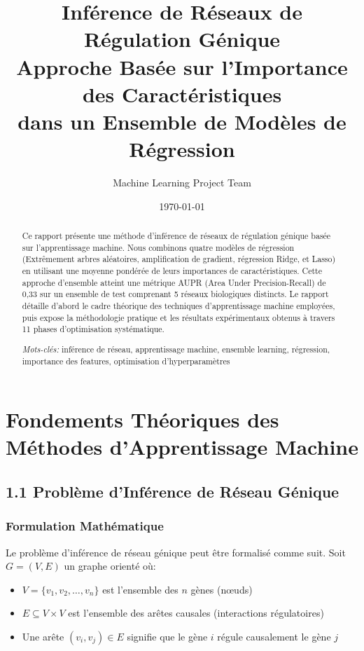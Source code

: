 \documentclass[12pt,a4paper,french]{article}
\title{Inférence de Réseaux de Régulation Génique \\
\large Approche Basée sur l'Importance des Caractéristiques \\
\large dans un Ensemble de Modèles de Régression}
\author{Machine Learning Project Team}
\date{\today}
\begin{document}
\maketitle

\begin{abstract}
Ce rapport présente une méthode d'inférence de réseaux de régulation génique basée sur l'apprentissage machine. Nous combinons quatre modèles de régression (Extrêmement arbres aléatoires, amplification de gradient, régression Ridge, et Lasso) en utilisant une moyenne pondérée de leurs importances de caractéristiques. Cette approche d'ensemble atteint une métrique AUPR (Area Under Precision-Recall) de 0,33 sur un ensemble de test comprenant 5 réseaux biologiques distincts. Le rapport détaille d'abord le cadre théorique des techniques d'apprentissage machine employées, puis expose la méthodologie pratique et les résultats expérimentaux obtenus à travers 11 phases d'optimisation systématique.

\textit{Mots-clés:} inférence de réseau, apprentissage machine, ensemble learning, régression, importance des features, optimisation d'hyperparamètres
\end{abstract}

\newpage
\tableofcontents
\newpage


\section{Fondements Théoriques des Méthodes d'Apprentissage Machine}

\subsection{1.1 Problème d'Inférence de Réseau Génique}

\subsubsection{Formulation Mathématique}

Le problème d'inférence de réseau génique peut être formalisé comme suit. Soit $G = (V, E)$ un graphe orienté où:
\begin{itemize}
    \item $V = \{v_1, v_2, \ldots, v_n\}$ est l'ensemble des $n$ gènes (nœuds)
    \item $E \subseteq V \times V$ est l'ensemble des arêtes causales (interactions régulatoires)
    \item Une arête $(v_i, v_j) \in E$ signifie que le gène $i$ régule causalement le gène $j$
\end{itemize}
\end{document}

